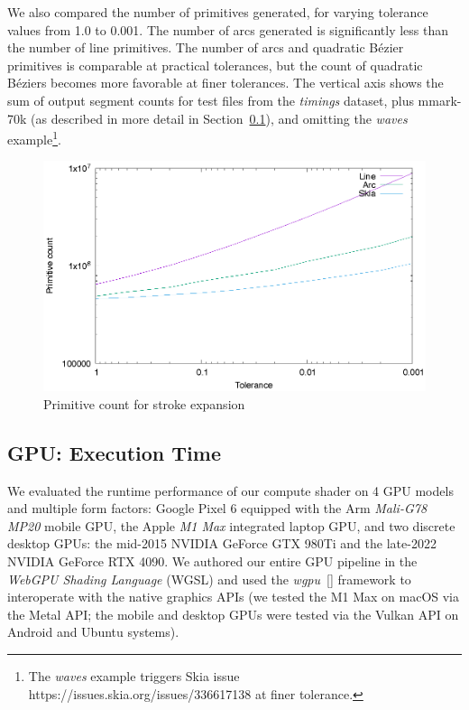 \documentclass[sigconf, nonacm]{acmart}
\begin{document}
We also compared the number of primitives generated, for varying tolerance values from 1.0 to 0.001. The number of arcs generated is significantly less than the number of line primitives. The number of arcs and quadratic Bézier primitives is comparable at practical tolerances, but the count of quadratic Béziers becomes more favorable at finer tolerances. The vertical axis shows the sum of output segment counts for test files from the \emph{timings} dataset, plus mmark-70k (as described in more detail in Section~\ref{subsection:gpu-results}), and omitting the \emph{waves} example\footnote{The \emph{waves} example triggers Skia issue https://issues.skia.org/issues/336617138 at finer tolerance.}.

\begin{figure}
    \includegraphics[scale=0.6]{prim_count}
    \caption{Primitive count for stroke expansion}
    \label{fig:prim_count}
\end{figure}

\subsection{GPU: Execution Time} \label{subsection:gpu-results}

We evaluated the runtime performance of our compute shader on 4 GPU models and multiple form factors: Google Pixel 6 equipped with the Arm \emph{Mali-G78 MP20} mobile GPU, the Apple \emph{M1 Max} integrated laptop GPU, and two discrete desktop GPUs: the mid-2015 NVIDIA {GeForce GTX 980Ti} and the late-2022 NVIDIA {GeForce RTX 4090}. We authored our entire GPU pipeline in the \emph{WebGPU Shading Language} (WGSL) and used the \emph{wgpu}~[] framework to interoperate with the native graphics APIs (we tested the M1 Max on macOS via the Metal API; the mobile and desktop GPUs were tested via the Vulkan API on Android and Ubuntu systems).
\end{document}
